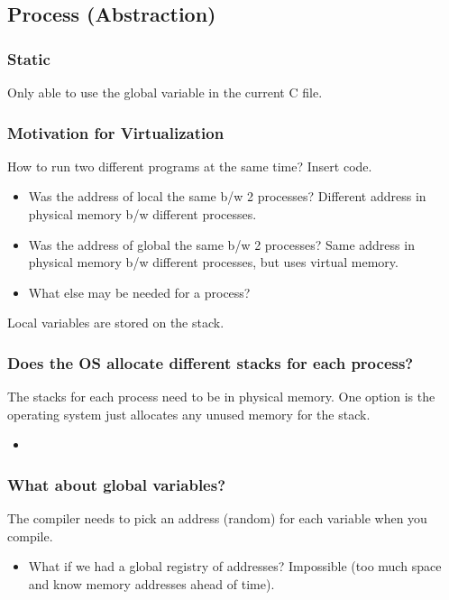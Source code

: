 \subsection{Process (Abstraction)}

\subsubsection{Static}
\begin{definition}
    Only able to use the global variable in the current C file.     
\end{definition}

\subsubsection{Motivation for Virtualization}
\begin{motivation}
    How to run two different programs at the same time?
        Insert code. 
        \begin{itemize}
            \item Was the address of local the same b/w 2 processes? Different address in physical memory b/w different processes.
            \item Was the address of global the same b/w 2 processes? Same address in physical memory b/w different processes, but uses virtual memory.
            \item What else may be needed for a process?  
        \end{itemize}
\end{motivation}

\begin{warning}
    Local variables are stored on the stack. 
\end{warning}

\subsubsection{Does the OS allocate different stacks for each process?}
\begin{definition}
    The stacks for each process need to be in physical memory. One option is the operating system just allocates any unused memory for the stack. 
    \begin{itemize}
        \item 
    \end{itemize}
\end{definition}

\subsubsection{What about global variables?}
\begin{definition}
    The compiler needs to pick an address (random) for each variable when you compile.
    \begin{itemize}
        \item What if we had a global registry of addresses? Impossible (too much space and know memory addresses ahead of time).
    \end{itemize}
\end{definition}

